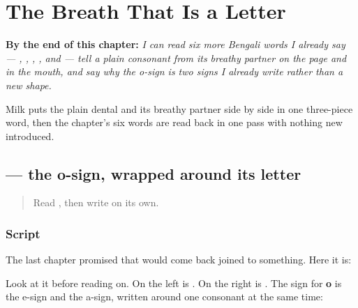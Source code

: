 
\chapter{The Breath That Is a Letter}
\label{ch:bn-breath-is-a-letter}

\begin{chapteropening}
\textbf{By the end of this chapter:} \emph{I can read six more Bengali words I already say — , , , ,  and  — tell a plain consonant from its breathy partner on the page and in the mouth, and say why the o-sign is two signs I already write rather than a new shape.}

Milk puts the plain dental and its breathy partner side by side in one three-piece word, then the chapter's six words are read back in one pass with nothing new introduced.
\end{chapteropening}

\section[-o]{ — the o-sign, wrapped around its letter}

\label{lesson:BN-W03-o-matra}



\begin{quote}
Read \textbf{}, then write \textbf{} on its own.
\end{quote}

\subsection*{Script}
The last chapter promised that \textbf{} would come back joined to something. Here it is:

\begin{quote}
\end{quote}

Look at it before reading on. On the left is \textbf{}. On the right is \textbf{}. The sign for \textbf{o} is the e-sign and the a-sign, written around one consonant at the same time:

